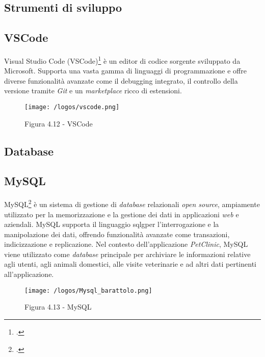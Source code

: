 \newpage
\subsection{Strumenti di sviluppo}
\subsection*{VSCode}
Visual Studio Code (VSCode)\footcite{site:vscode} è un editor di codice sorgente sviluppato da Microsoft. Supporta una vasta gamma di linguaggi di programmazione e offre diverse funzionalità avanzate come il debugging integrato, il controllo della versione tramite \emph{Git} e un \emph{marketplace} ricco di estensioni.
\begin{figure}[H] 
    \centering 
    \texttt{[image: /logos/vscode.png]} 
    \caption{Figura 4.12 - VSCode}
\end{figure}


\newpage
\subsection{Database}
\subsection*{MySQL}
MySQL\footcite{site:mysql} è un sistema di gestione di \emph{database} relazionali \emph{open source}, ampiamente utilizzato per la memorizzazione e la gestione dei dati in applicazioni \emph{web} e aziendali. MySQL supporta il linguaggio \gls{sqlg}\glsfirstoccur per l'interrogazione e la manipolazione dei dati, offrendo funzionalità avanzate come transazioni, indicizzazione e replicazione. Nel contesto dell'applicazione \emph{PetClinic}, MySQL viene utilizzato come \emph{database} principale per archiviare le informazioni relative agli utenti, agli animali domestici, alle visite veterinarie e ad altri dati pertinenti all'applicazione.
\begin{figure}[H] 
    \centering 
    \texttt{[image: /logos/Mysql\_barattolo.png]} 
    \caption{Figura 4.13 - MySQL}
\end{figure}


\newpage
